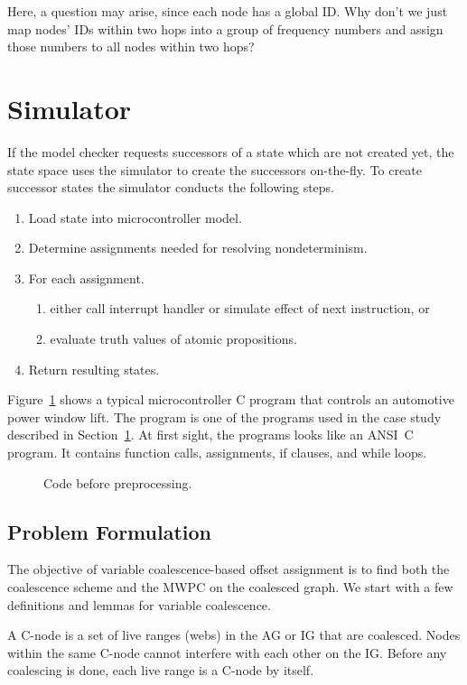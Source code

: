 Here, a question may arise, since each node has a global ID. Why
don't we just map nodes' IDs within two hops into a group of
frequency numbers and assign those numbers to all nodes within two
hops?

\section{Simulator}
\label{sec:sim}

If the model checker requests successors of a state which are not
created yet, the state space uses the simulator to create the
successors on-the-fly. To create successor states the simulator
conducts the following steps.
\begin{enumerate}
  \item Load state into microcontroller model.
  \item Determine assignments needed for resolving nondeterminism.
  \item For each assignment.
  \begin{enumerate}
    \item either call interrupt handler or simulate effect of next instruction, or
    \item evaluate truth values of atomic propositions.
  \end{enumerate}
  \item Return resulting states.
\end{enumerate}
Figure~\ref{fig:one} shows a typical microcontroller C program that
controls an automotive power window lift. The program is one of the
programs used in the case study described in Section~\ref{sec:sim}.
At first sight, the programs looks like an ANSI~C program. It
contains function calls, assignments, if clauses, and while loops.
\begin{figure}
  \caption{Code before preprocessing.}
  \label{fig:one}
\end{figure}

\subsection{Problem Formulation}

The objective of variable coalescence-based offset assignment is to find
both the coalescence scheme and the MWPC on the coalesced graph. We start
with a few definitions and lemmas for variable coalescence.

\begin{definition}
  A C-node is a set of
  live ranges (webs) in the AG or IG that are coalesced. Nodes within the same
  C-node cannot interfere with each other on the IG. Before any coalescing is
  done, each live range is a C-node by itself.
\end{definition}

